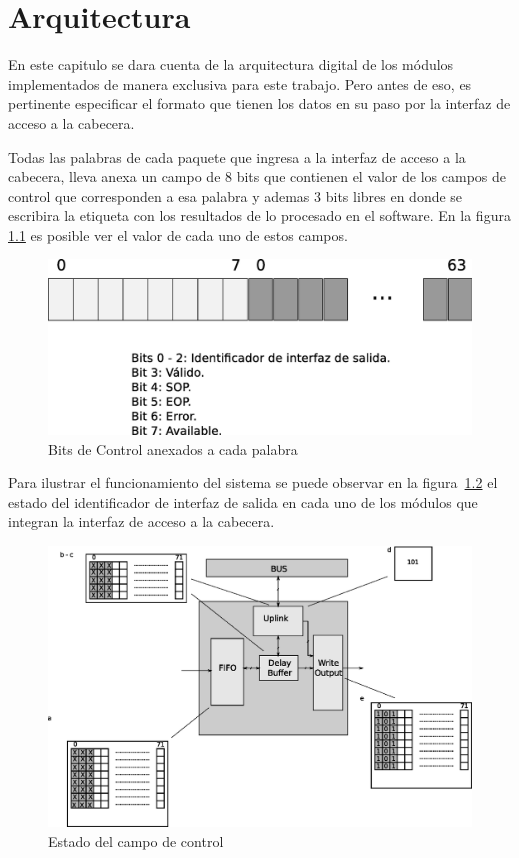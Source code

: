 \chapter{Arquitectura}

En este capitulo se dara cuenta de la arquitectura digital de los módulos implementados de manera exclusiva para este trabajo. Pero antes de eso, es pertinente especificar el formato que tienen los datos en su paso por la interfaz de acceso a la cabecera.

Todas las palabras de cada paquete que ingresa a la interfaz de acceso a la cabecera, lleva anexa un campo de 8 bits que contienen el valor de los campos de control que corresponden a esa palabra y ademas 3 bits libres en donde se escribira la etiqueta con los resultados de lo procesado en el software. En la figura \ref{fig:datocontrol}  es posible ver el valor de cada uno de estos campos.

\begin{figure}[H]
  \centering
	\includegraphics[scale=0.40]{3-arquitectura/graf/datocontrol.eps}
  \caption{Bits de Control anexados a cada palabra}
  \label{fig:datocontrol}
\end{figure}

Para ilustrar el funcionamiento del sistema se puede observar en la figura~\ref{fig:interfaz1} el estado del identificador de interfaz de salida en cada uno de los módulos que integran la interfaz de acceso a la cabecera.

\begin{figure}[H]
  \centering
	\includegraphics[scale=0.60]{3-arquitectura/graf/moduloexp.eps}
  \caption{Estado del campo de control}
  \label{fig:interfaz1}
\end{figure}

